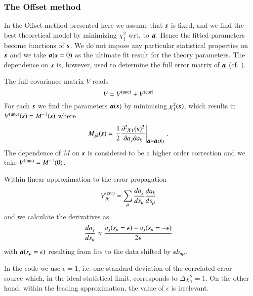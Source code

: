 \subsubsection{The Offset method}

In the Offset method presented here we assume that $\mb\rs$ is fixed, 
and we find the best theoretical model by minimizing
$\chi_1^2$ wrt. to $\mb a$. 
Hence the fitted parameters become functions
of $\mb\rs$. %
We do not impose any particular statistical properties on $\mb\rs$ 
and we take $\mb a(\mb\rs=0)$ as the ultimate fit result for the theory parameters. 
The dependence on $\mb\rs$ is, however, used to determine
the full error matrix of $\mb a$ (cf. \cite{Pascaud:1995qs}).

The full covariance matrix $V$ reads
\begin{equation}
\label{eq:Cv-full}
V = V^{\mathrm{(unc)}} + V^{\mathrm{(cor)}}
\end{equation}
For each $\mb\rs$ we find the parameters $\mb a(\mb \rs)$ by minimising $\chi_1^2(\mb \rs)$, which results in
$\Vstat(\mb \rs) = M^{-1}(\mb \rs)$ where
\begin{equation}
M_{jk}(\mb \rs)
= \left.
{\frac12} \frac{\partial^2\chi_1(\mb \rs)^2}{\partial a_j \partial a_k}\right\vert_{\mb a = \mb a(\mb \rs)}
\,.
\end{equation}
The dependence of $M$ on $\mb \rs$ is considered to be a higher order correction
and we take $V^{\mathrm{(unc)}} = M^{-1}(0)$.

Within linear approximation to the error propagation
\begin{equation}
\label{eq:Vsysp}
V^{\mathrm{(cor)}}_{jk} = \sum_\mu \frac{da_j}{ds_\mu} \frac{da_k}{ds_\mu}
\end{equation} 
and we calculate the derivatives as
\begin{equation}
\frac{da_j}{ds_\mu} \approx
\frac{a_j(s_\mu=\epsilon) - a_j(s_\mu=-\epsilon)}{2\epsilon}
\end{equation}
with $\mb a(\rs_\mu=\epsilon)$ resulting from
fits to the data shifted by $\epsilon b_{n\mu}$.

In the code we use $\epsilon=1$, i.e. one standard deviation of
the correlated error source which, in the ideal statistical limit, corresponds to 
$\Delta\chi_1^2 = 1$.
On the other hand, within the leading approximation, the value of $\epsilon$ is irrelevant.

